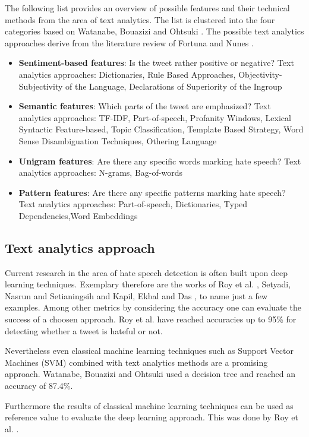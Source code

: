 \noindent
The following list provides an overview of possible features and their technical methods from the area of text analytics. The list is clustered into the four categories based on Watanabe, Bouazizi and Ohtsuki \cite{Watanabe.2018}. The possible text analytics approaches derive from the literature review of Fortuna and Nunes \cite{Fortuna.2018}.
\begin{itemize}
	\item \textbf{Sentiment-based features}: Is the tweet rather positive or negative? \newline
	Text analytics approaches: Dictionaries, Rule Based Approaches, Ob\-jec\-ti\-vi\-ty-Subjectivity of the Language, Declarations of Superiority of the Ingroup \cite{Fortuna.2018}
	\item \textbf{Semantic features}: Which parts of the tweet are emphasized? \newline
	Text analytics approaches: TF-IDF, Part-of-speech, Profanity Windows, Lexical Syntactic Feature-based, Topic Classification, Template Based Strategy, Word Sense Disambiguation Techniques, Othering Language \cite{Fortuna.2018}
	\item \textbf{Unigram features}: Are there any specific words marking hate speech? \newline
	Text analytics approaches: N-grams, Bag-of-words \cite{Fortuna.2018}
	\item \textbf{Pattern features}: Are there any specific patterns marking hate speech? \newline
	Text analytics approaches: Part-of-speech, Dictionaries, Typed De\-pen\-den\-cies,Word Embeddings \cite{Fortuna.2018}
\end{itemize}


\subsection{Text analytics approach}

Current research in the area of hate speech detection is often built upon deep learning techniques. Exemplary therefore are the works of Roy et al. \cite{Roy.2020}, Setyadi, Nasrun and Setianingsih \cite{NabiilaAdaniSetyadi.2018} and Kapil, Ekbal and Das \cite{Kapil.2020}, to name just a few examples. Among other metrics by considering the accuracy one can evaluate the success of a choosen approach. Roy et al. \cite{Roy.2020} have reached accuracies up to 95\% for detecting whether a tweet is hateful or not.

\noindent
Nevertheless even classical machine learning techniques such as Support Vector Machines (SVM) combined with text analytics methods are a promis\-ing approach.
Watanabe, Bouazizi and Ohtsuki \cite{Watanabe.2018} used a decision tree and reached an accuracy of 87.4\%.

\noindent
Furthermore the results of classical machine learning techniques can be used as reference value to evaluate the deep learning approach. This was done by Roy et al. \cite{Roy.2020}.
